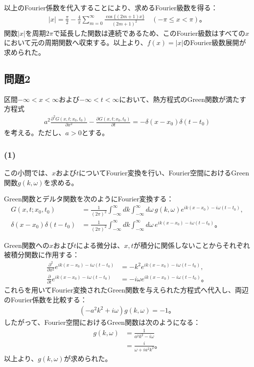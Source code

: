 \documentclass[platex,dvipdfmx,a4paper]{jsarticle}
\newcommand{\hb}[2]{\frac{\partial #1}{\partial #2}}
\begin{document}
  以上のFourier係数を代入することにより、求めるFourier級数を得る：
  \begin{align*}
    |x|
    =\frac{\pi}{2}
    -\frac{4}{\pi}\sum_{m=0}^{\infty}
    \frac{\cos\{(2m+1)x\}}{(2m+1)^2}
    \quad(-\pi\leq x<\pi)。
  \end{align*}
  関数$|x|$を周期$2\pi$で延長した関数は連続であるため、このFourier級数はすべての$x$において元の周期関数へ収束する。以上より、$f(x)=|x|$のFourier級数展開が求められた。

  \subsection*{問題2}

  区間$-\infty<x<\infty$および$-\infty<t<\infty$において、熱方程式のGreen関数が満たす方程式
  \begin{align*}
    a^2\hb{^2G(x,t;x_0,t_0)}{x^2}
    -\hb{G(x,t;x_0,t_0)}{t}
    =-\delta(x-x_0)\delta(t-t_0)
  \end{align*}
  を考える。ただし、$a>0$とする。

  \subsubsection*{(1)}

  この小問では、$x$および$t$についてFourier変換を行い、Fourier空間におけるGreen関数$g(k,\omega)$を求める。

  Green関数とデルタ関数を次のようにFourier変換する：
  \begin{align*}
    G(x,t;x_0,t_0)
    &=\frac{1}{(2\pi)^2}
    \int_{-\infty}^{\infty}dk
    \int_{-\infty}^{\infty}d\omega\,
    g(k,\omega)e^{ik(x-x_0)-i\omega(t-t_0)},\\
    \delta(x-x_0)\delta(t-t_0)
    &=\frac{1}{(2\pi)^2}
    \int_{-\infty}^{\infty}dk
    \int_{-\infty}^{\infty}d\omega\,
    e^{ik(x-x_0)-i\omega(t-t_0)}。
  \end{align*}

  Green関数への$x$および$t$による微分は、$x,t$が積分に関係しないことからそれぞれ被積分関数に作用する：
  \begin{align*}
    \hb{^2}{x^2}
    e^{ik(x-x_0)-i\omega(t-t_0)}
    &=-k^2e^{ik(x-x_0)-i\omega(t-t_0)},\\
    \hb{}{t}
    e^{ik(x-x_0)-i\omega(t-t_0)}
    &=-i\omega e^{ik(x-x_0)-i\omega(t-t_0)}。
  \end{align*}
  これらを用いてFourier変換されたGreen関数を与えられた方程式へ代入し、両辺のFourier係数を比較する：
  \begin{align*}
    \left(-a^2k^2+i\omega\right)g(k,\omega)=-1。
  \end{align*}
  したがって、Fourier空間におけるGreen関数は次のようになる：
  \begin{align*}
    g(k,\omega)
    &=\frac{1}{a^2k^2-i\omega}\\
    &=\frac{i}{\omega+ia^2k^2}。
  \end{align*}
  以上より、$g(k,\omega)$が求められた。
\end{document}
